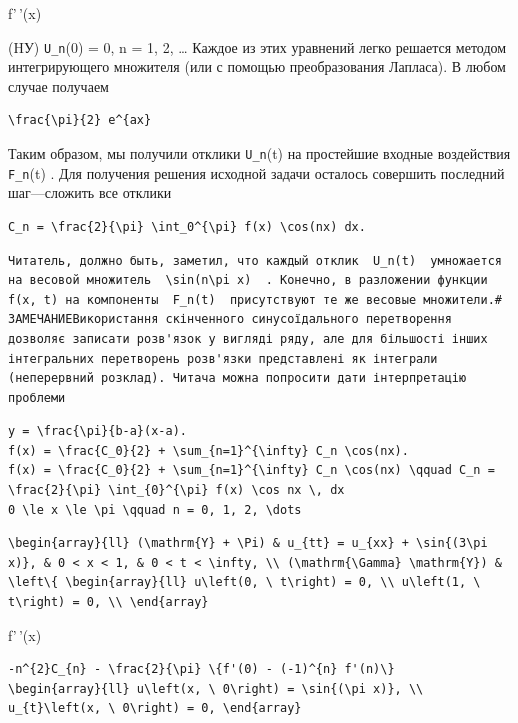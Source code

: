 \documentclass[
  ukrainian,
]{article}
\begin{document}
f'\,'(x)

(HУ) \texttt{U\_n}(0) = 0, n = 1, 2, \ldots{} Каждое из этих уравнений
легко решается методом интегрирующего множителя (или с помощью
преобразования Лапласа). В любом случае получаем

\begin{verbatim}
\frac{\pi}{2} e^{ax}
\end{verbatim}

Таким образом, мы получили отклики \texttt{U\_n}(t) на простейшие
входные воздействия \texttt{F\_n}(t) . Для получения решения исходной
задачи осталось совершить последний шаг---сложить все отклики

\begin{verbatim}
C_n = \frac{2}{\pi} \int_0^{\pi} f(x) \cos(nx) dx.
\end{verbatim}

\begin{verbatim}
Читатель, должно быть, заметил, что каждый отклик  U_n(t)  умножается на весовой множитель  \sin(n\pi x)  . Конечно, в разложении функции f(x, t) на компоненты  F_n(t)  присутствуют те же весовые множители.# ЗАМЕЧАНИЕВикористання скінченного синусоїдального перетворення дозволяє записати розв'язок у вигляді ряду, але для більшості інших інтегральних перетворень розв'язки представлені як інтеграли (неперервний розклад). Читача можна попросити дати інтерпретацію проблеми
\end{verbatim}

\begin{verbatim}
y = \frac{\pi}{b-a}(x-a).
f(x) = \frac{C_0}{2} + \sum_{n=1}^{\infty} C_n \cos(nx).
f(x) = \frac{C_0}{2} + \sum_{n=1}^{\infty} C_n \cos(nx) \qquad C_n = \frac{2}{\pi} \int_{0}^{\pi} f(x) \cos nx \, dx
0 \le x \le \pi \qquad n = 0, 1, 2, \dots
\end{verbatim}

\begin{verbatim}
\begin{array}{ll} (\mathrm{Y} + \Pi) & u_{tt} = u_{xx} + \sin{(3\pi x)}, & 0 < x < 1, & 0 < t < \infty, \\ (\mathrm{\Gamma} \mathrm{Y}) & \left\{ \begin{array}{ll} u\left(0, \ t\right) = 0, \\ u\left(1, \ t\right) = 0, \\ \end{array}
\end{verbatim}

f'\,'(x)

\begin{verbatim}
-n^{2}C_{n} - \frac{2}{\pi} \{f'(0) - (-1)^{n} f'(n)\}
\begin{array}{ll} u\left(x, \ 0\right) = \sin{(\pi x)}, \\ u_{t}\left(x, \ 0\right) = 0, \end{array}
\end{verbatim}
\end{document}
